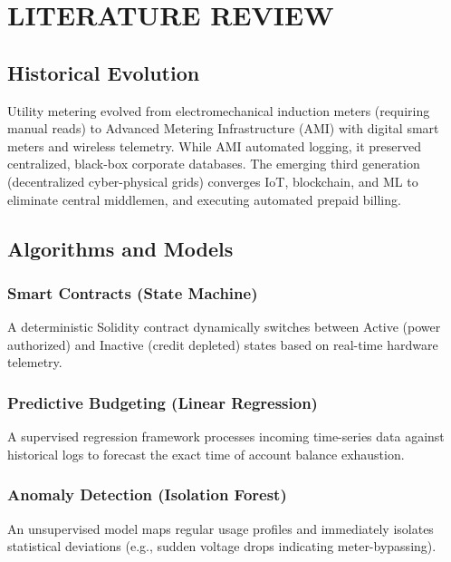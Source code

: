 \chapter{LITERATURE REVIEW}
\section{Historical Evolution}
Utility metering evolved from electromechanical induction meters (requiring manual reads) to Advanced Metering Infrastructure (AMI) with digital smart meters and wireless telemetry. While AMI automated logging, it preserved centralized, black-box corporate databases. The emerging third generation (decentralized cyber-physical grids) converges IoT, blockchain, and ML to eliminate central middlemen, and executing automated prepaid billing. \cite{ref2}
\section{Algorithms and Models}
\subsection{Smart Contracts (State Machine)}
A deterministic Solidity contract dynamically switches between Active (power authorized) and Inactive (credit depleted) states based on real-time hardware telemetry.
\subsection{Predictive Budgeting (Linear Regression)}    
A supervised regression framework processes incoming time-series data against historical logs to forecast the exact time of account balance exhaustion.\cite{ref3}
\subsection{Anomaly Detection (Isolation Forest)}    
An unsupervised model maps regular usage profiles and immediately isolates statistical deviations (e.g., sudden voltage drops indicating meter-bypassing).

